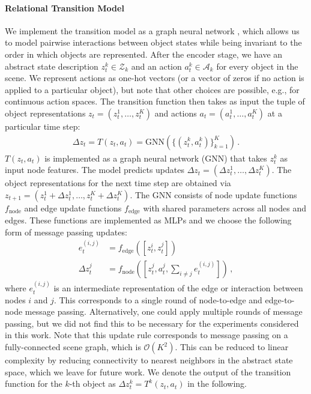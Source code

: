 \documentclass{article} %
\begin{document}
\paragraph{Relational Transition Model}
We implement the transition model as a graph neural network \citep{scarselli2009graph,li2015gated,kipf2016semi,battaglia2016interaction,gilmer2017neural,battaglia2018relational}, which allows us to model pairwise interactions between object states while being invariant to the order in which objects are represented. After the encoder stage, we have an abstract state description $z_t^k\in\mathcal{Z}_k$ and an action $a_t^k\in\mathcal{A}_k$ for every object in the scene. We represent actions as one-hot vectors (or a vector of zeros if no action is applied to a particular object), but note that other choices are possible, e.g., for continuous action spaces. The transition function then takes as input the tuple of object representations $z_t = (z_t^1, \ldots, z_t^K)$ and actions $a_t = (a_t^1, \ldots, a_t^K)$ at a particular time step:
\begin{align}
\Delta z_t = T(z_t, a_t) = \mathrm{GNN}(\{(z^k_t, a^k_t)\}_{k=1}^K)\, .
\end{align}
$T(z_t, a_t)$ is implemented as a graph neural network (GNN) that takes $z^k_t$ as input node features. The model predicts updates $\Delta z_t=(\Delta z_t^1,\ldots,\Delta z_t^K)$. The object representations for the next time step are obtained via $z_{t+1} = (z^1_t + \Delta z^1_{t}, \ldots, z^K_t + \Delta z^K_{t})$. The GNN consists of node update functions $f_{\text{node}}$ and edge update functions $f_{\text{edge}}$ with shared parameters across all nodes and edges. These functions are implemented as MLPs and we choose the following form of message passing updates:
\begin{align}
e_t^{(i,j)} &= f_{\text{edge}}([z_t^i,z_t^j]) \\
\Delta z^j_t &= f_{\text{node}}([z_t^j,a_t^j,\textstyle\sum_{i\neq j} e_t^{(i, j)}]) \, ,
\end{align}
where $e_t^{(i,j)}$ is an intermediate representation of the edge or interaction between nodes $i$ and $j$. This corresponds to a single round of node-to-edge and edge-to-node message passing. Alternatively, one could apply multiple rounds of message passing, but we did not find this to be necessary for the experiments considered in this work. Note that this update rule corresponds to message passing on a fully-connected scene graph, which is $\mathcal{O}(K^2)$. This can be reduced to linear complexity by reducing connectivity to nearest neighbors in the abstract state space, which we leave for future work. We denote the output of the transition function for the $k$-th object as $\Delta z^k_t = T^k(z_t, a_t)$ in the following.
\end{document}
